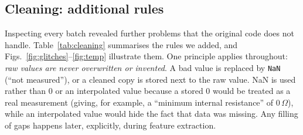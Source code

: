 \subsection{Cleaning: additional rules}
Inspecting every batch revealed further problems that the original code
does not handle. Table~\ref{tab:cleaning} summarises the rules we added,
and Figs.~\ref{fig:glitches}--\ref{fig:temp} illustrate them. One principle
applies throughout: \emph{raw values are never overwritten or invented}.
A bad value is replaced by \texttt{NaN} (``not measured''), or a cleaned
copy is stored next to the raw value. NaN is used rather than 0 or an
interpolated value because a stored 0 would be treated as a real
measurement (giving, for example, a ``minimum internal resistance'' of
0\,$\Omega$), while an interpolated value would hide the fact that data was
missing. Any filling of gaps happens later, explicitly, during feature
extraction.

